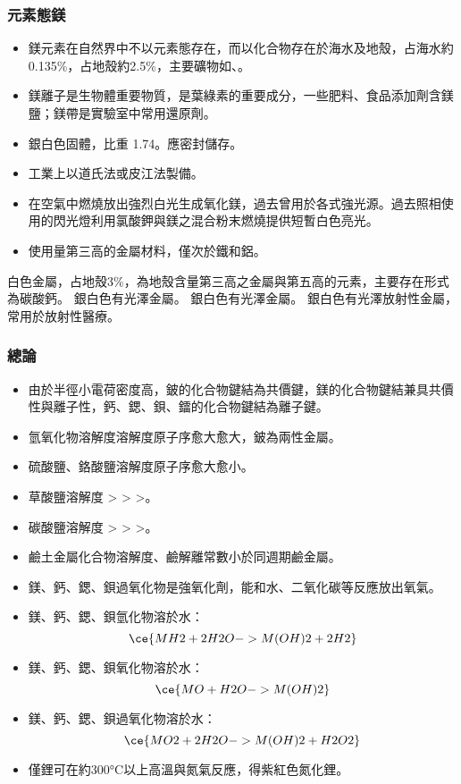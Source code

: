 \documentclass[a4paper,12pt]{report}
\begin{document}
\begin{itemize}
\begin{itemize}
\subsubsection{元素態鎂}
\begin{itemize}
\item 鎂元素在自然界中不以元素態存在，而以化合物存在於海水及地殼，占海水約0.135\%，占地殼約2.5\%，主要礦物如、。
\item 鎂離子是生物體重要物質，是葉綠素的重要成分，一些肥料、食品添加劑含鎂鹽；鎂帶是實驗室中常用還原劑。
\item 銀白色固體，比重 1.74。應密封儲存。
\item 工業上以道氏法或皮江法製備。
\item 在空氣中燃燒放出強烈白光生成氧化鎂，過去曾用於各式強光源。過去照相使用的閃光燈利用氯酸鉀與鎂之混合粉末燃燒提供短暫白色亮光。
\item 使用量第三高的金屬材料，僅次於鐵和鋁。
\end{itemize}
白色金屬，占地殼3\%，為地殼含量第三高之金屬與第五高的元素，主要存在形式為碳酸鈣。
銀白色有光澤金屬。
銀白色有光澤金屬。
銀白色有光澤放射性金屬，常用於放射性醫療。
\subsubsection{總論}
\begin{itemize}
\item 由於半徑小電荷密度高，鈹的化合物鍵結為共價鍵，鎂的化合物鍵結兼具共價性與離子性，鈣、鍶、鋇、鐳的化合物鍵結為離子鍵。
\item 氫氧化物溶解度溶解度原子序愈大愈大，鈹為兩性金屬。
\item 硫酸鹽、鉻酸鹽溶解度原子序愈大愈小。
\item 草酸鹽溶解度 > > >。
\item 碳酸鹽溶解度 > > >。
\item 鹼土金屬化合物溶解度、鹼解離常數小於同週期鹼金屬。
\item 鎂、鈣、鍶、鋇過氧化物是強氧化劑，能和水、二氧化碳等反應放出氧氣。
\item 鎂、鈣、鍶、鋇氫化物溶於水：
\[\ce{MH2 + 2H2O -> M(OH)2 + 2H2}\]
\item 鎂、鈣、鍶、鋇氧化物溶於水：
\[\ce{MO + H2O -> M(OH)2}\]
\item 鎂、鈣、鍶、鋇過氧化物溶於水：
\[\ce{MO2 + 2H2O -> M(OH)2 + H2O2}\]
\item 僅鋰可在約300°C以上高溫與氮氣反應，得紫紅色氮化鋰。
\end{itemize}

\end{itemize}
\end{itemize}
\end{document}
